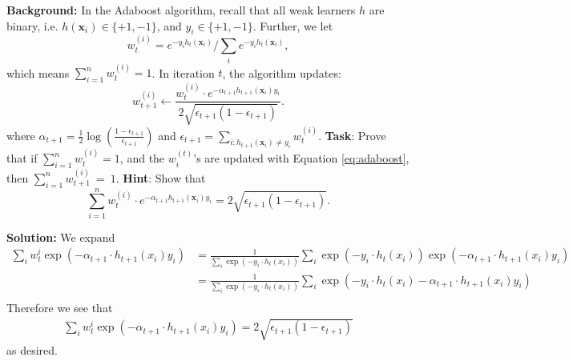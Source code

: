 \documentclass[11pt]{article}
\begin{document}
{\bf Background:} In the Adaboost algorithm, recall that all weak learners $h$ are binary, i.e. $h(\mathbf x_i) \in \{+1, -1\}$, and $y_i \in \{+1, -1\}$. 
Further, we let 
$$w_t^{(i)} = e^{-y_i h_t(\mathbf x_i)} \bigg / \sum_i e^{-y_i h_t(\mathbf x_i)},$$
which means $\sum_{i=1}^n w^{(i)}_t = 1$.
	In iteration $t$, the algorithm updates: 
	\begin{equation}
	\label{eq:adaboost}
	w^{(i)} _{t+1}\leftarrow \frac{w^{(i)}_t\cdot e^{-\alpha_{t+1} h_{t+1}(\mathbf x_i)y_i}}{2\sqrt{\epsilon_{t+1}(1-\epsilon_{t+1})}}.
	\end{equation}
	where $\alpha_{t+1} = \frac{1}{2}\log \left(\frac{1 - \epsilon_{t+1}}{\epsilon_{t+1}}\right)$ and  $\epsilon_{t+1} = \sum_{i:h_{t+1}(\mathbf x_i)\neq y_i}w^{(i)}_t$. 
\newline
{\bf Task}: Prove that if $\sum_{i=1}^n w^{(i)}_t = 1$, 
and the $w_i^{(t)}$'s are updated with Equation \eqref{eq:adaboost},
then $\sum_{i=1}^n w^{(i)}_{t+1}~=~1$.
\newline 
{\bf Hint}: Show that
 \[
 \sum_{i=1}^{n} w^{(i)}_t \cdot e^{-\alpha_{t+1} h_{t+1}(\mathbf x_i)y_i} = 2\sqrt{\epsilon_{t+1} (1-\epsilon_{t+1})}.
 \]

\textbf{Solution:}
We expand \begin{align*}
    \sum_i w_t^i \exp(-\alpha_{t+1}\cdot h_{t+1}(x_i)y_i) &= \frac{1}{\sum_i \exp(-y_i\cdot h_t(x_i))}\sum_i\exp(-y_i\cdot h_t(x_i))\exp(-\alpha_{t+1}\cdot h_{t+1}(x_i)y_i) \\
    &= \frac{1}{\sum_i \exp(-y_i\cdot h_t(x_i))}\sum_i\exp(-y_i\cdot h_t(x_i)-\alpha_{t+1}\cdot h_{t+1}(x_i)y_i) \\
\end{align*} Therefore we see that \begin{align*}
    \sum_i w_t^i \exp(-\alpha_{t+1}\cdot h_{t+1}(x_i)y_i) = 2\sqrt{\epsilon_{t+1}(1-\epsilon_{t+1})}
\end{align*} as desired.
\end{document}
